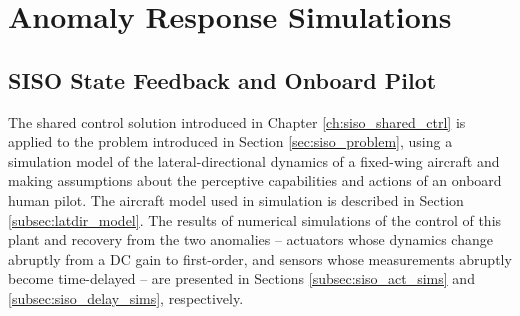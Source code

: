 \chapter{Anomaly Response Simulations}  \label{ch:numerical}
\section{SISO State Feedback and Onboard Pilot}

The shared control solution introduced in Chapter \ref{ch:siso_shared_ctrl} is applied to the problem introduced in Section \ref{sec:siso_problem}, using a simulation model of the lateral-directional dynamics of a fixed-wing aircraft and making assumptions about the perceptive capabilities and actions of an onboard human pilot. The aircraft model used in simulation is described in Section \ref{subsec:latdir_model}. The results of numerical simulations of the control of this plant and recovery from the two anomalies -- actuators whose dynamics change abruptly from a DC gain to first-order, and sensors whose measurements abruptly become time-delayed -- are presented in Sections \ref{subsec:siso_act_sims} and \ref{subsec:siso_delay_sims}, respectively.

